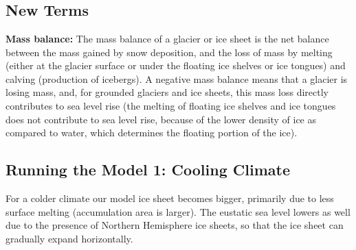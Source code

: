 \section{}

\subsection{New Terms}
\textbf{Mass balance:} The mass balance of a glacier or ice sheet is the net balance between the mass gained by snow deposition, and the loss of mass by melting (either at the glacier surface or under the floating ice shelves or ice tongues) and calving (production of icebergs). A negative mass balance means that a glacier is losing mass, and, for grounded glaciers and ice sheets, this mass loss directly contributes to sea level rise (the melting of floating ice shelves and ice tongues does not contribute to sea level rise, because of the lower density of ice as compared to water, which determines the floating portion of the ice). \cite{massBalance}


\subsection{Running the Model 1: Cooling Climate}
For a colder climate our model ice sheet becomes bigger, primarily due to less surface melting (accumulation area is larger). The eustatic sea level lowers as well due to the presence of Northern Hemisphere ice sheets, so that the ice sheet can gradually expand horizontally.


